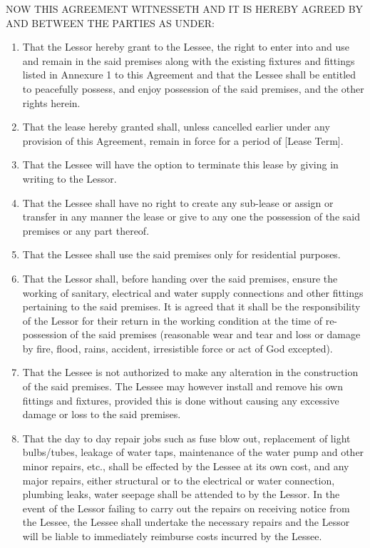 \documentclass[legalpaper,12pt]{article}
\begin{document}
 
NOW THIS AGREEMENT WITNESSETH AND IT IS HEREBY AGREED BY AND BETWEEN THE PARTIES AS UNDER:\\
\begin{enumerate}
    \item That the Lessor hereby grant to the Lessee, the right to enter into and use and remain in the said premises along with the existing fixtures and fittings listed in Annexure 1 to this Agreement and that the Lessee shall be entitled to peacefully possess, and enjoy possession of the said premises, and the other rights herein.

    \item That the lease hereby granted shall, unless cancelled earlier under any provision of this Agreement, remain in force for a period of [Lease Term].

    \item That the Lessee will have the option to terminate this lease by giving \textbf{} in writing to the Lessor.

    \item That the Lessee shall have no right to create any sub-lease or assign or transfer in any manner the lease or give to any one the possession of the said premises or any part thereof.

    \item That the Lessee shall use the said premises only for residential purposes.
    
    \item That the Lessor shall, before handing over the said premises, ensure the working of sanitary, electrical and water supply connections and other fittings pertaining to the said premises. It is agreed that it shall be the responsibility of the Lessor for their return in the working condition at the time of re-possession of the said premises (reasonable wear and tear and loss or damage by fire, flood, rains, accident, irresistible force or act of God excepted).

    \item That the Lessee is not authorized to make any alteration in the construction of the said premises. The Lessee may however install and remove his own fittings and fixtures, provided this is done without causing any excessive damage or loss to the said premises.

    \item That the day to day repair jobs such as fuse blow out, replacement of light bulbs/tubes, leakage of water taps, maintenance of the water pump and other minor repairs, etc., shall be effected by the Lessee at its own cost, and any major repairs, either structural or to the electrical or water connection, plumbing leaks, water seepage shall be attended to by the Lessor. In the event of the Lessor failing to carry out the repairs on receiving notice from the Lessee, the Lessee shall undertake the necessary repairs and the Lessor will be liable to immediately reimburse costs incurred by the Lessee.


\end{enumerate}
\end{document}
